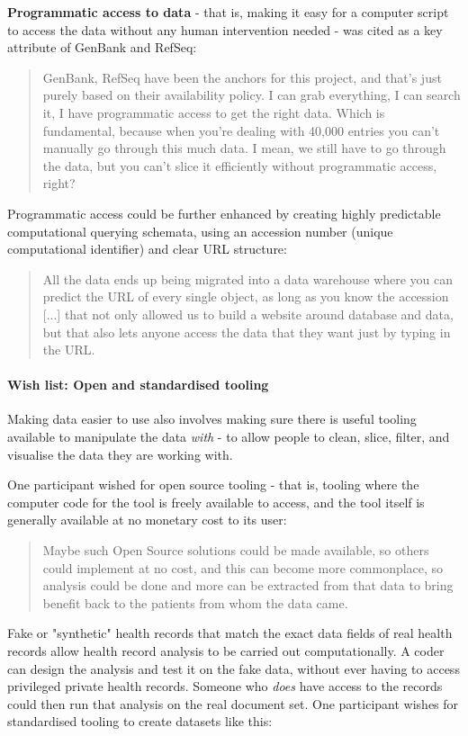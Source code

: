 \documentclass{CUP-JNL-DAP}%
\begin{document}
\textbf{Programmatic access to data} - that is, making it easy for a computer script to access the data without any human intervention needed - was cited as a key attribute of GenBank and RefSeq: 

\blockquote{GenBank, RefSeq have been the anchors for this project, and that's just purely based on their availability policy. I can grab everything, I can search it, I have programmatic access to get the right data. Which is fundamental, because when you're dealing with 40,000 entries you can't manually go through this much data. I mean, we still have to go through the data, but you can't slice it efficiently without programmatic access, right?}

Programmatic access could be further enhanced by creating highly predictable computational querying schemata, using an accession number (unique computational identifier) and clear URL structure: 

\blockquote{All the data ends up being migrated into a data warehouse where you can predict the URL of every single object, as long as you know the accession [...] that not only allowed us to build a website around database and data, but that also lets anyone access the data that they want just by typing in the URL.}

\paragraph{Wish list: Open and standardised tooling}
Making data easier to use also involves making sure there is useful tooling available to manipulate the data \textit{with} - to allow people to clean, slice, filter, and visualise the data they are working with.

One participant wished for open source tooling - that is, tooling where the computer code for the tool is freely available to access, and the tool itself is generally available at no monetary cost to its user: 

\blockquote{Maybe such Open Source solutions could be made available, so others could implement at no cost, and this can become more commonplace, so analysis could be done and more can be extracted from that data to bring benefit back to the patients from whom the data came.}

Fake or "synthetic" health records that match the exact data fields of real health records allow health record analysis to be carried out computationally. A coder can design the analysis and test it on the fake data, without ever having to access privileged private health records. Someone who \textit{does} have access to the records could then run that analysis on the real document set. One participant wishes for standardised tooling to create datasets like this: 
\end{document}

